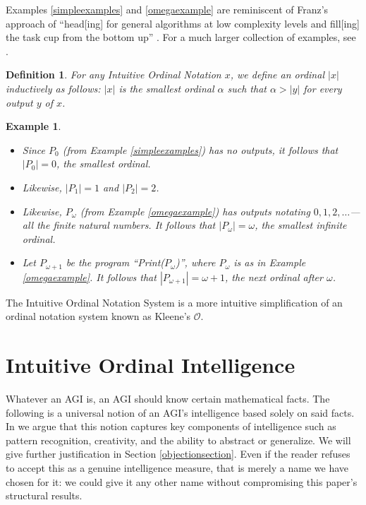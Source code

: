 \documentclass[runningheads]{llncs}
\newtheorem{myexample}[mytheorem]{Example}
\newtheorem{mydefinition}[mytheorem]{Definition}
\begin{document}
Examples \ref{simpleexamples} and \ref{omegaexample} are reminiscent
of Franz's approach of ``head[ing] for general algorithms at low complexity levels
and fill[ing] the task cup from the bottom up'' \cite{franz2015toward}.
For a much larger collection of examples, see \cite{github}.

\begin{mydefinition}
    For any Intuitive Ordinal Notation $x$, we define an ordinal $|x|$
    inductively as follows: $|x|$ is the smallest ordinal $\alpha$
    such that $\alpha>|y|$ for every output $y$ of $x$.
\end{mydefinition}

\begin{myexample}
    \begin{itemize}
        \item
        Since $P_0$ (from Example \ref{simpleexamples}) has no outputs,
        it follows that $|P_0|=0$, the smallest ordinal.
        \item
        Likewise, $|P_1|=1$ and $|P_2|=2$.
        \item
        Likewise, $P_\omega$ (from Example \ref{omegaexample}) has outputs
        notating $0, 1, 2, \ldots$---all the finite natural numbers. It follows
        that $|P_\omega|=\omega$, the smallest
        infinite ordinal.
        \item
        Let $P_{\omega+1}$ be the program ``Print($P_\omega$)'',
        where $P_\omega$ is as in Example \ref{omegaexample}.
        It follows that $|P_{\omega+1}|=\omega+1$, the next ordinal after
        $\omega$.
    \end{itemize}
\end{myexample}

The Intuitive Ordinal Notation System is a more intuitive simplification of
an ordinal notation system known as Kleene's $\mathcal O$.

\section{Intuitive Ordinal Intelligence}
\label{informalargumentsection}

Whatever an AGI is, an AGI should know certain
mathematical facts.
The following is a universal notion of an AGI's intelligence based
solely on said facts. In \cite{alexander2019measuring}
we argue that this notion captures key components of intelligence such as
pattern recognition, creativity, and the ability to abstract or
generalize. We will give further justification in
Section \ref{objectionsection}. Even if the reader refuses to accept this as
a genuine intelligence measure, that is merely a name we have chosen for it:
we could give it any other name without compromising this paper's structural
results.
\end{document}
